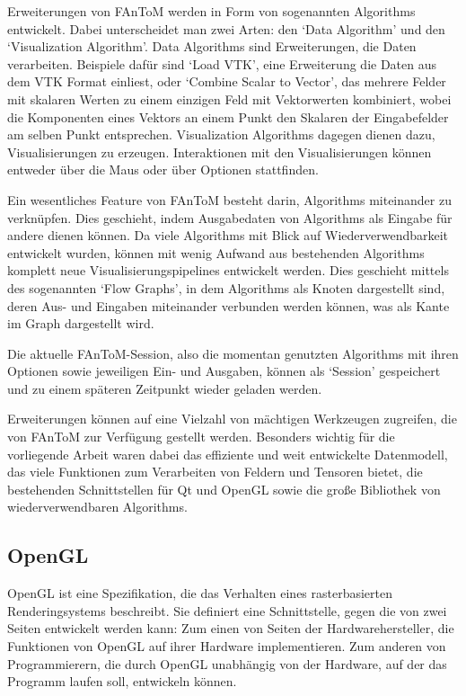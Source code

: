 \documentclass[a4paper,fontsize=12pt,toc=bib,halfparskip,ngerman]{scrartcl}
\begin{document}
Erweiterungen von FAnToM werden in Form von sogenannten Algorithms entwickelt. Dabei unterscheidet man zwei Arten: den `Data Algorithm' und den `Visualization Algorithm'. Data Algorithms sind Erweiterungen, die Daten verarbeiten. Beispiele daf\"ur sind `Load VTK', eine Erweiterung die Daten aus dem VTK Format einliest, oder `Combine Scalar to Vector', das mehrere Felder mit skalaren Werten zu einem einzigen Feld mit Vektorwerten kombiniert, wobei die Komponenten eines Vektors an einem Punkt den Skalaren der Eingabefelder am selben Punkt entsprechen.
Visualization Algorithms dagegen dienen dazu, Visualisierungen zu erzeugen. Interaktionen mit den Visualisierungen k\"onnen entweder \"uber die Maus oder \"uber Optionen stattfinden.

Ein wesentliches Feature von FAnToM besteht darin, Algorithms miteinander zu verkn\"upfen. Dies geschieht, indem Ausgabedaten von Algorithms als Eingabe f\"ur andere dienen k\"onnen. Da viele Algorithms mit Blick auf Wiederverwendbarkeit entwickelt wurden, k\"onnen mit wenig Aufwand aus bestehenden Algorithms komplett neue Visualisierungspipelines entwickelt werden. Dies geschieht mittels des sogenannten `Flow Graphs', in dem Algorithms als Knoten dargestellt sind, deren Aus- und Eingaben miteinander verbunden werden k\"onnen, was als Kante im Graph dargestellt wird.

Die aktuelle FAnToM-Session, also die momentan genutzten Algorithms mit ihren Optionen sowie jeweiligen Ein- und Ausgaben, k\"onnen als `Session' gespeichert und zu einem sp\"ateren Zeitpunkt wieder geladen werden.

Erweiterungen k\"onnen auf eine Vielzahl von m\"achtigen Werkzeugen zugreifen, die von FAnToM zur Verf\"ugung gestellt werden. Besonders wichtig f\"ur die vorliegende Arbeit waren dabei das effiziente und weit entwickelte Datenmodell, das viele Funktionen zum Verarbeiten von Feldern und Tensoren bietet, die bestehenden Schnittstellen f\"ur Qt und OpenGL sowie die gro{\ss}e Bibliothek von wiederverwendbaren Algorithms.
\subsection{OpenGL}
\label{sec:OpenGL}
OpenGL\cite{openglWebsite} ist eine Spezifikation, die das Verhalten eines rasterbasierten Renderingsystems beschreibt. Sie definiert eine Schnittstelle, gegen die von zwei Seiten entwickelt werden kann: Zum einen von Seiten der Hardwarehersteller, die Funktionen von OpenGL auf ihrer Hardware implementieren. Zum anderen von Programmierern, die durch OpenGL unabh\"angig von der Hardware, auf der das Programm laufen soll, entwickeln k\"onnen. 
\end{document}
